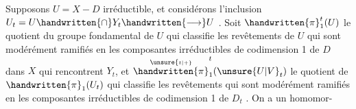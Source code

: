 Supposons $U=X-D$ irréductible, et considérons l'inclusion $U_t=U\handwritten{\cap}Y_t\handwritten{\longrightarrow}U$ .  Soit $\handwritten{\pi}_1^t(U)$ le  quotient du groupe fondamental de $U$  qui classifie les revêtements de $U$ qui sont modérément ramifiés en les composantes irréductibles de codimension 1 de $D$ dans $X$ qui rencontrent $Y_t$,  et $\overset{\unsure{\scriptscriptstyle t|+}}{\handwritten{\pi}}_1^t(\unsure{U|V}_t)$ le quotient  de $\handwritten{\pi}_1(U_t)$ qui classifie les revêtements qui sont modérément ramifiés en les composantes irréductibles de codimension 1 de $D_t$ . On a un homomor-
